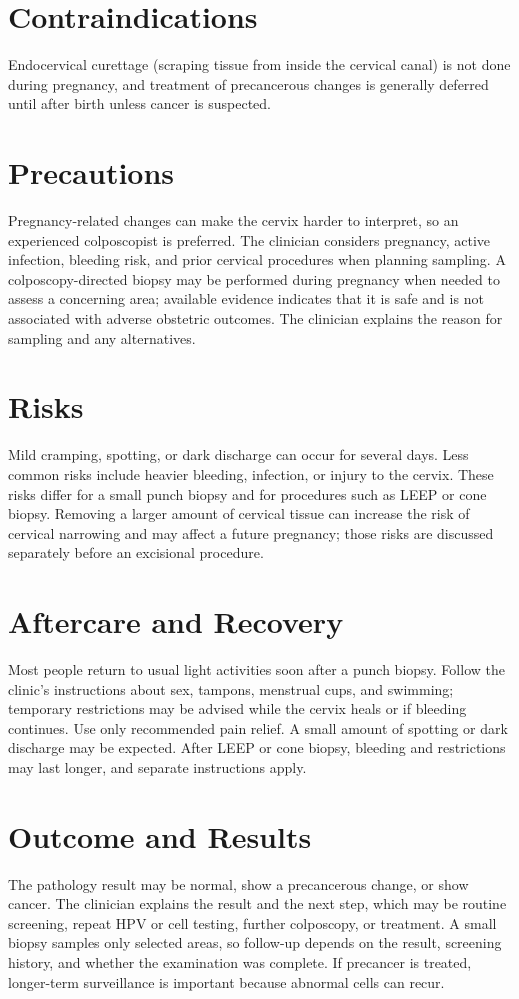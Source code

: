 \section*{Contraindications}
Endocervical curettage (scraping tissue from inside the cervical canal) is not done during pregnancy, and treatment of precancerous changes is generally deferred until after birth unless cancer is suspected.

\section*{Precautions}
Pregnancy-related changes can make the cervix harder to interpret, so an experienced colposcopist is preferred. The clinician considers pregnancy, active infection, bleeding risk, and prior cervical procedures when planning sampling. A colposcopy-directed biopsy may be performed during pregnancy when needed to assess a concerning area; available evidence indicates that it is safe and is not associated with adverse obstetric outcomes. The clinician explains the reason for sampling and any alternatives.

\section*{Risks}
Mild cramping, spotting, or dark discharge can occur for several days. Less common risks include heavier bleeding, infection, or injury to the cervix. These risks differ for a small punch biopsy and for procedures such as LEEP or cone biopsy. Removing a larger amount of cervical tissue can increase the risk of cervical narrowing and may affect a future pregnancy; those risks are discussed separately before an excisional procedure.

\section*{Aftercare and Recovery}
Most people return to usual light activities soon after a punch biopsy. Follow the clinic's instructions about sex, tampons, menstrual cups, and swimming; temporary restrictions may be advised while the cervix heals or if bleeding continues. Use only recommended pain relief. A small amount of spotting or dark discharge may be expected. After LEEP or cone biopsy, bleeding and restrictions may last longer, and separate instructions apply.

\section*{Outcome and Results}
The pathology result may be normal, show a precancerous change, or show cancer. The clinician explains the result and the next step, which may be routine screening, repeat HPV or cell testing, further colposcopy, or treatment. A small biopsy samples only selected areas, so follow-up depends on the result, screening history, and whether the examination was complete. If precancer is treated, longer-term surveillance is important because abnormal cells can recur.

